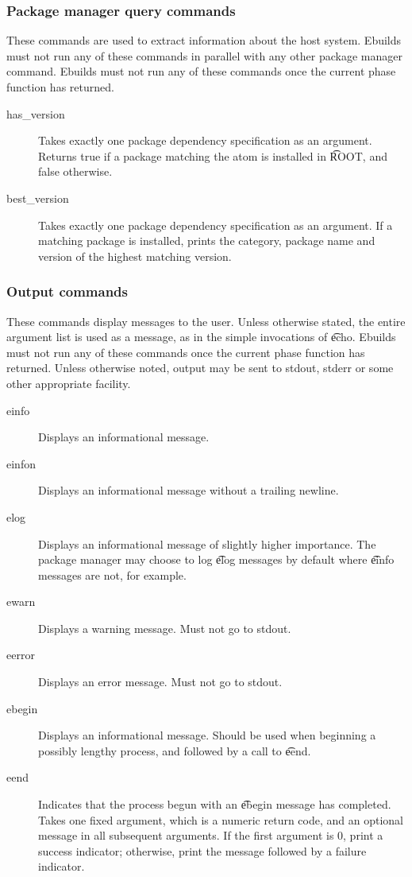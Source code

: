 \subsubsection{Package manager query commands}
These commands are used to extract information about the host system. Ebuilds must not run any of
these commands in parallel with any other package manager command. Ebuilds must not run any of
these commands once the current phase function has returned.
\begin{description}
\item[has\_version] Takes exactly one package dependency specification as an argument. Returns
    true if a package matching the atom is installed in \t{ROOT}, and false otherwise.
\item[best\_version] Takes exactly one package dependency specification as an argument. If a
    matching package is installed, prints the category, package name and version of the highest
    matching version.
\end{description}

\subsubsection{Output commands}
These commands display messages to the user. Unless otherwise stated, the entire argument list is
used as a message, as in the simple invocations of \t{echo}. Ebuilds must not run any of these
commands once the current phase function has returned. Unless otherwise noted, output may be sent to
stdout, stderr or some other appropriate facility.
\begin{description}
\item[einfo] Displays an informational message.
\item[einfon] Displays an informational message without a trailing newline.
\item[elog] Displays an informational message of slightly higher importance. The package
    manager may choose to log \t{elog} messages by default where \t{einfo} messages are not, for
    example.
\item[ewarn] Displays a warning message. Must not go to stdout.
\item[eerror] Displays an error message. Must not go to stdout.
\item[ebegin] Displays an informational message. Should be used when beginning a possibly
    lengthy process, and followed by a call to \t{eend}.
\item[eend] Indicates that the process begun with an \t{ebegin} message has completed. Takes one
    fixed argument, which is a numeric return code, and an optional message in all subsequent
    arguments.  If the first argument is 0, print a success indicator; otherwise, print the message
    followed by a failure indicator.
\end{description}

